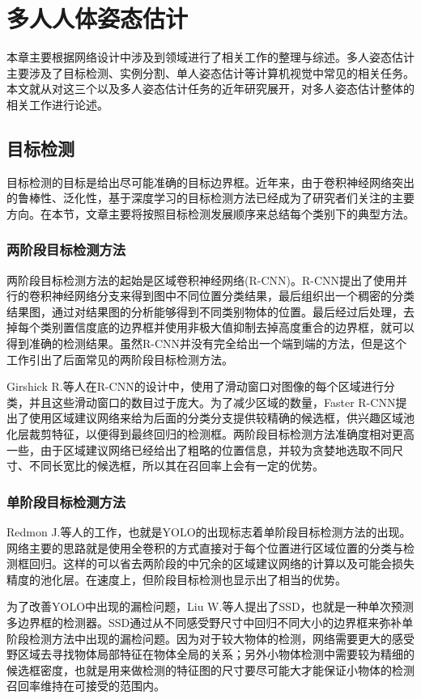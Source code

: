 \chapter{多人人体姿态估计}
\label{cha:related}
本章主要根据网络设计中涉及到领域进行了相关工作的整理与综述。多人姿态估计主要涉及了目标检测、实例分割、单人姿态估计等计算机视觉中常见的相关任务。本文就从对这三个以及多人姿态估计任务的近年研究展开，对多人姿态估计整体的相关工作进行论述。
\section{目标检测}
\label{sec:detect}
目标检测的目标是给出尽可能准确的目标边界框。近年来，由于卷积神经网络突出的鲁棒性、泛化性，基于深度学习的目标检测方法已经成为了研究者们关注的主要方向。在本节，文章主要将按照目标检测发展顺序来总结每个类别下的典型方法。
\subsection{两阶段目标检测方法}
\label{2stagedetector}
两阶段目标检测方法的起始是区域卷积神经网络(R-CNN)\cite{Girshick_2014_CVPR}。R-CNN提出了使用并行的卷积神经网络分支来得到图中不同位置分类结果，最后组织出一个稠密的分类结果图，通过对结果图的分析能够得到不同类别物体的位置。最后经过后处理，去掉每个类别置信度底的边界框并使用非极大值抑制去掉高度重合的边界框，就可以得到准确的检测结果。虽然R-CNN并没有完全给出一个端到端的方法，但是这个工作引出了后面常见的两阶段目标检测方法。

Girshick R.等人在R-CNN的设计中，使用了滑动窗口对图像的每个区域进行分类，并且这些滑动窗口的数目过于庞大。为了减少区域的数量，Faster R-CNN\cite{Ren2015Faster}提出了使用区域建议网络来给为后面的分类分支提供较精确的候选框，供兴趣区域池化层裁剪特征，以便得到最终回归的检测框。两阶段目标检测方法准确度相对更高一些，由于区域建议网络已经给出了粗略的位置信息，并较为贪婪地选取不同尺寸、不同长宽比的候选框，所以其在召回率上会有一定的优势。

\subsection{单阶段目标检测方法}
\label{subsec:1stagedetector}
Redmon J.\cite{redmon2016you}等人的工作，也就是YOLO的出现标志着单阶段目标检测方法的出现。网络主要的思路就是使用全卷积的方式直接对于每个位置进行区域位置的分类与检测框回归。这样的可以省去两阶段的中冗余的区域建议网络的计算以及可能会损失精度的池化层。在速度上，但阶段目标检测也显示出了相当的优势。

为了改善YOLO中出现的漏检问题，Liu W.等人提出了SSD\cite{liu2016ssd}，也就是一种单次预测多边界框的检测器。SSD通过从不同感受野尺寸中回归不同大小的边界框来弥补单阶段检测方法中出现的漏检问题。因为对于较大物体的检测，网络需要更大的感受野区域去寻找物体局部特征在物体全局的关系；另外小物体检测中需要较为精细的候选框密度，也就是用来做检测的特征图的尺寸要尽可能大才能保证小物体的检测召回率维持在可接受的范围内。

